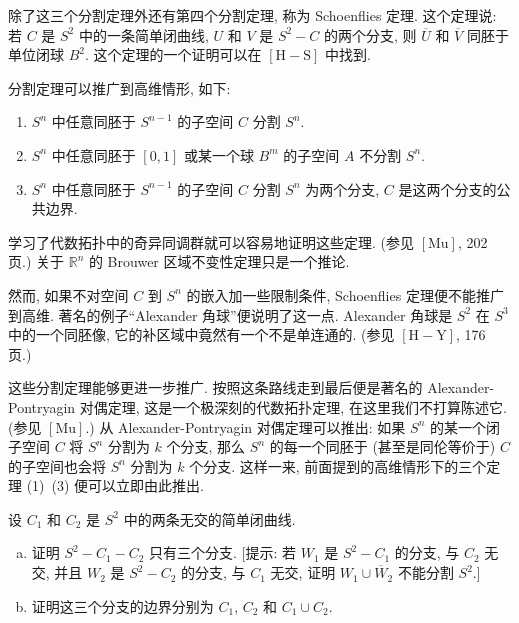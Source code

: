 除了这三个分割定理外还有第四个分割定理, 称为 Schoenflies 定理. 这个定理说: 若 $C$ 是 $S^{2}$ 中的一条简单闭曲线, $U$ 和 $V$ 是 $S^{2}-C$ 的两个分支, 则 $\overline{U}$ 和 $\overline{V}$ 同胚于单位闭球 $B^{2}$. 这个定理的一个证明可以在 $[\mathrm{H-S}]$ 中找到.

分割定理可以推广到高维情形, 如下:

\begin{enumerate}[(1)]
\item $S^{n}$ 中任意同胚于 $S^{n-1}$ 的子空间 $C$ 分割 $S^{n}$.
\item $S^{n}$ 中任意同胚于 $[0,1]$ 或某一个球 $B^{m}$ 的子空间 $A$ 不分割 $S^{n}$.
\item $S^{n}$ 中任意同胚于 $S^{n-1}$ 的子空间 $C$ 分割 $S^{n}$ 为两个分支, $C$ 是这两个分支的公共边界.
\end{enumerate}

学习了代数拓扑中的奇异同调群就可以容易地证明这些定理. (参见 $[\mathrm{Mu}]$, 202 页.) 关于 $\mathbb{R}^{n}$ 的 Brouwer 区域不变性定理只是一个推论.

然而, 如果不对空间 $C$ 到 $S^{n}$ 的嵌入加一些限制条件, Schoenflies 定理便不能推广到高维. 著名的例子``Alexander 角球''便说明了这一点. Alexander 角球是 $S^{2}$ 在 $S^{3}$ 中的一个同胚像, 它的补区域中竟然有一个不是单连通的. (参见 $[\mathrm{H-Y}]$, 176 页.)

这些分割定理能够更进一步推广. 按照这条路线走到最后便是著名的 Alexander-Pontryagin 对偶定理, 这是一个极深刻的代数拓扑定理, 在这里我们不打算陈述它. (参见 $[\mathrm{Mu}]$.) 从 Alexander-Pontryagin 对偶定理可以推出: 如果 $S^{n}$ 的某一个闭子空间 $C$ 将 $S^{n}$ 分割为 $k$ 个分支, 那么 $S^{n}$ 的每一个同胚于 (甚至是同伦等价于) $C$ 的子空间也会将 $S^{n}$ 分割为 $k$ 个分支. 这样一来, 前面提到的高维情形下的三个定理 (1)~(3) 便可以立即由此推出.

\begin{exercise}\label{ch10:ex-jordan-curve-1}
设 $C_{1}$ 和 $C_{2}$ 是 $S^{2}$ 中的两条无交的简单闭曲线.

\begin{enumerate}[(a)]
\item 证明 $S^{2}-C_{1}-C_{2}$ 只有三个分支. [提示: 若 $W_{1}$ 是 $S^{2}-C_{1}$ 的分支, 与 $C_{2}$ 无交, 并且 $W_{2}$ 是 $S^{2}-C_{2}$ 的分支, 与 $C_{1}$ 无交, 证明 $W_{1}\cup\overline{W}_{2}$ 不能分割 $S^{2}$.]
\item 证明这三个分支的边界分别为 $C_{1}$, $C_{2}$ 和 $C_{1}\cup C_{2}$.
\end{enumerate}
\end{exercise}

